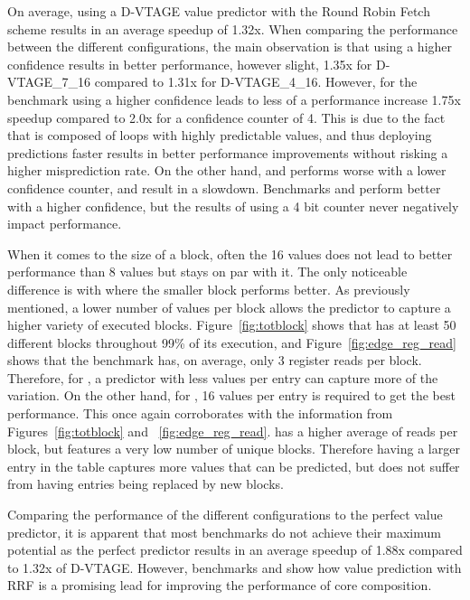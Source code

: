 On average, using a D-VTAGE value predictor with the Round Robin Fetch scheme results in an average speedup of 1.32x.
When comparing the performance between the different configurations, the main observation is that using a higher confidence results in better performance, however slight, 1.35x for D-VTAGE\_7\_16 compared to 1.31x for D-VTAGE\_4\_16.
However, for the benchmark  using a higher confidence leads to less of a performance increase 1.75x speedup compared to 2.0x for a confidence counter of 4.
This is due to the fact that  is composed of loops with highly predictable values, and thus deploying predictions faster results in better performance improvements without risking a higher misprediction rate.
On the other hand,  and  performs worse with a lower confidence counter, and result in a slowdown.
Benchmarks  and  perform better with a higher confidence, but the results of using a 4 bit counter never negatively impact performance.

When it comes to the size of a block, often the 16 values does not lead to better performance than 8 values but stays on par with it.
The only noticeable difference is with  where the smaller block performs better.
As previously mentioned, a lower number of values per block allows the predictor to capture a higher variety of executed blocks.
Figure~\ref{fig:totblock} shows that  has at least 50 different blocks throughout 99\% of its execution, and Figure~\ref{fig:edge_reg_read} shows that the benchmark has, on average, only 3 register reads per block.
Therefore, for , a predictor with less values per entry can capture more of the variation.
On the other hand, for , 16 values per entry is required to get the best performance.
This once again corroborates with the information from Figures~\ref{fig:totblock} and ~\ref{fig:edge_reg_read}.
 has a higher average of reads per block, but features a very low number of unique blocks.
Therefore having a larger entry in the table captures more values that can be predicted, but does not suffer from having entries being replaced by new blocks.

Comparing the performance of the different configurations to the perfect value predictor, it is apparent that most benchmarks do not achieve their maximum potential as the perfect predictor results in an average speedup of 1.88x compared to 1.32x of D-VTAGE.
However, benchmarks  and  show how value prediction with RRF is a promising lead for improving the performance of core composition.

